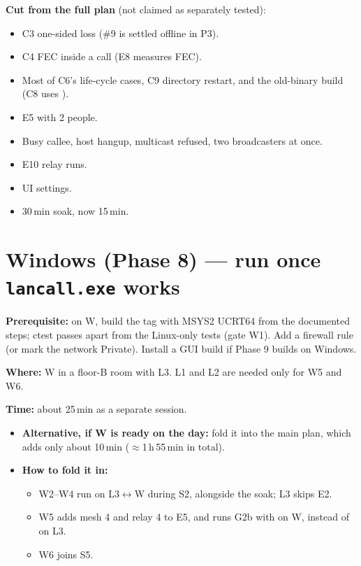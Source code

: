 \documentclass[10pt,a4paper]{article}
\newcommand{\cmd}[1]{\texttt{\detokenize{#1}}}
\begin{document}
\textbf{Cut from the full plan} (not claimed as separately tested):
\begin{itemize}
  \item C3 one-sided loss (\#9 is settled offline in P3).
  \item C4 FEC inside a call (E8 measures FEC).
  \item Most of C6's life-cycle cases, C9 directory restart, and the old-binary build (C8 uses
    \cmd{nc}).
  \item E5 with 2 people.
  \item Busy callee, host hangup, multicast refused, two broadcasters at once.
  \item E10 relay runs.
  \item UI settings.
  \item 30\,min soak, now 15\,min.
\end{itemize}

\section{Windows (Phase 8) --- run once \texttt{lancall.exe} works}\label{sec:windows}

\textbf{Prerequisite:} on W, build the tag with MSYS2 UCRT64 from the documented steps; ctest
passes apart from the Linux-only tests (gate W1). Add a firewall rule (or mark the network
Private). Install a GUI build if Phase 9 builds on Windows.

\textbf{Where:} W in a floor-B room with L3. L1 and L2 are needed only for W5 and W6.

\textbf{Time:} about 25\,min as a separate session.
\begin{itemize}
  \item \textbf{Alternative, if W is ready on the day:} fold it into the main plan, which
    adds only about 10\,min ($\approx$1\,h\,55\,min in total).
  \item \textbf{How to fold it in:}
    \begin{itemize}
      \item W2--W4 run on L3$\leftrightarrow$W during S2, alongside the soak; L3 skips E2.
      \item W5 adds mesh 4 and relay 4 to E5, and runs G2b with \cmd{lancall_relay.exe} on W,
        instead of on L3.
      \item W6 joins S5.
    \end{itemize}
\end{itemize}
\end{document}
